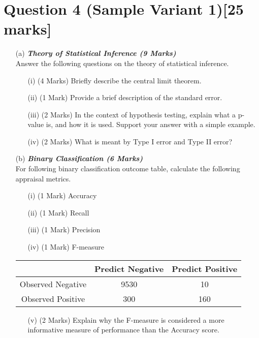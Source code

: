 \documentclass[]{article}
\begin{document}
\section*{Question 4 (Sample Variant 1)[25 marks]}

\begin{itemize}
\item[(a)]
 \textbf{\textit{Theory of Statistical Inference  (9 Marks)}}\\ Answer the following questions on the theory of statistical inference.
\begin{itemize}
\item[(i)] (4 Marks) Briefly describe the central limit theorem.
\item[(ii)] (1 Mark) Provide a brief description of the standard error.
\item[(iii)] (2 Marks) In the context of hypothesis testing, explain what a p-value is, and how it is used. Support your answer with a simple example.
\item[(iv)] (2 Marks) What is meant by Type I error and Type II error?
\end{itemize}


\item[(b)] \textbf{\textit{Binary Classification (6 Marks)}}\\
For following binary classification outcome table, calculate the following appraisal metrics.
\begin{itemize}	
\item[(i)] (1 Mark)	Accuracy
\item[(ii)] (1 Mark)	Recall
\item[(iii)] (1 Mark)	Precision
\item[(iv)] (1 Mark)	F-measure
\end{itemize}	

\begin{center}
\begin{tabular}{|c|c|c|}
\hline  & \phantom{spa}Predict Negative\phantom{spa} & \phantom{spa}Predict Positive\phantom{spa} \\ 
\hline\phantom{spa} Observed Negative \phantom{spa}&	9530	&	10	\\ 
\hline \phantom{spa}Observed Positive\phantom{spa} & 	300	&	160	\\ 
\hline 
\end{tabular} 
\end{center}

\begin{itemize}	
\item[(v)] (2 Marks) Explain why the F-measure is considered a more informative measure of performance than the Accuracy score.
\end{itemize}


\end{itemize}
\end{document}
